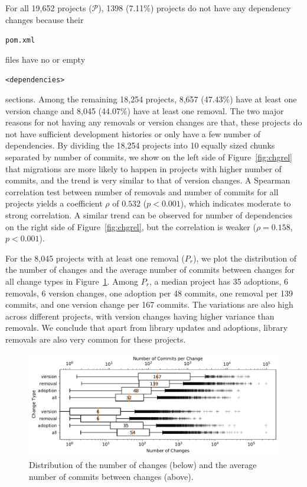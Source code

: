 \documentclass[sigconf, screen]{acmart}
\newcommand{\Code}[1]{\begin{small}\texttt{#1}\end{small}}
\begin{document}
For all 19,652 projects ($\mathcal{P}$), 1398 (7.11\%) projects do not have any dependency changes because their \Code{pom.xml} files have no or empty \Code{<dependencies>} sections. 
Among the remaining 18,254 projects, 8,657 (47.43\%) have at least one version change and 8,045 (44.07\%) have at least one removal.
The two major reasons for not having any removals or version changes are that, these projects do not have sufficient development histories or only have a few number of dependencies.
By dividing the 18,254 projects into 10 equally sized chunks separated by number of commits, we show on the left side of Figure~\ref{fig:chgrel} that migrations are more likely to happen in projects with higher number of commits, and the trend is very similar to that of version changes. %
A Spearman correlation test between number of removals and number of commits for all projects yields a coefficient $\rho$ of $0.532$ ($p < 0.001$), which indicates moderate to strong correlation.
A similar trend can be observed for number of dependencies on the right side of Figure~\ref{fig:chgrel}, but the correlation is weaker ($\rho = 0.158$, $p < 0.001$).

For the 8,045 projects with at least one removal ($P_r$), we plot the distribution of the number of changes and the average number of commits between changes for all change types in Figure~\ref{fig:chgdis}.
Among $P_r$, a median project has 35 adoptions, 6 removals, 6 version changes, one adoption per 48 commits, one removal per 139 commits, and one version change per 167 commits.
The variations are also high across different projects, with version changes having higher variance than removals.
We conclude that apart from library updates and adoptions, library removals are also very common for these projects.


\begin{figure}[t]
  \centering
  \includegraphics[width=\linewidth]{fig/chgdis.pdf}
\vspace{-7mm}
  \caption{
   Distribution of the number of changes (below) and the average number of commits between changes (above).
  }
  \label{fig:chgdis}
\vspace{-4mm}
\end{figure}
\end{document}
